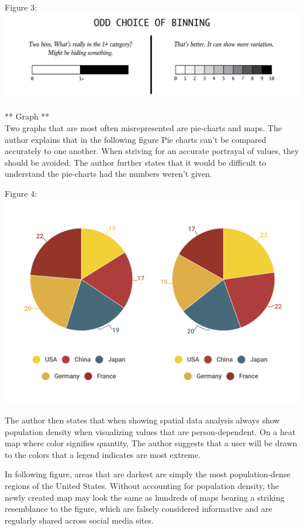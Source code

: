 \documentclass[]{book}
\theoremstyle{definition}
\theoremstyle{definition}
\theoremstyle{definition}
\theoremstyle{remark}
\begin{document}
Figure 3:\\
\includegraphics{images/Segmentation 1.png}

** Graph **\\
Two graphs that are most often misrepresented are pie-charts and maps.
The author explains that in the following figure Pie charts can't be
compared accurately to one another. When striving for an accurate
portrayal of values, they should be avoided. The author further states
that it would be difficult to understand the pie-charts had the numbers
weren't given.

Figure 4:\\
\includegraphics{images/PieCharts.png}

The author then states that when showing spatial data analysis always
show population density when visualizing values that are
person-dependent. On a heat map where color signifies quantity, The
author suggests that a user will be drawn to the colors that a legend
indicates are most extreme.

In following figure, areas that are darkest are simply the most
population-dense regions of the United States. Without accounting for
population density, the newly created map may look the same as hundreds
of maps bearing a striking resemblance to the figure, which are falsely
considered informative and are regularly shared across social media
sites.
\end{document}
